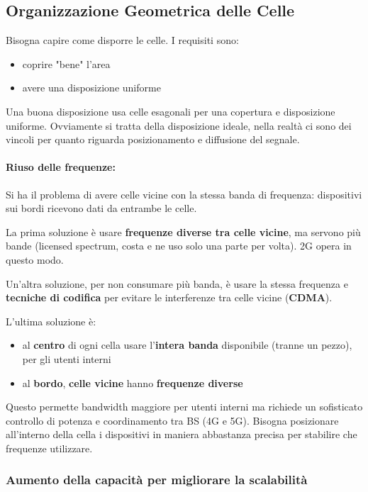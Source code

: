 \subsection{Organizzazione Geometrica delle Celle}

Bisogna capire come disporre le celle. I requisiti sono:
\begin{itemize}
	\item coprire "bene" l'area

	\item avere una disposizione uniforme
\end{itemize}

Una buona disposizione usa celle esagonali per una copertura e disposizione uniforme. Ovviamente si tratta della disposizione ideale, nella realtà ci sono dei vincoli per quanto riguarda posizionamento e diffusione del segnale.

\paragraph{Riuso delle frequenze:} Si ha il problema di avere celle vicine con la stessa banda di frequenza: dispositivi sui bordi ricevono dati da entrambe le celle. 

La prima soluzione è usare \textbf{frequenze diverse tra celle vicine}, ma servono più bande (licensed spectrum, costa e ne uso solo una parte per volta). 2G opera in questo modo.

Un'altra soluzione, per non consumare più banda, è usare la stessa frequenza e \textbf{tecniche di codifica} per evitare le interferenze tra celle vicine (\textbf{CDMA}).

L'ultima soluzione è:
\begin{itemize}
	\item al \textbf{centro} di ogni cella usare l'\textbf{intera banda} disponibile (tranne un pezzo), per gli utenti interni

	\item al \textbf{bordo}, \textbf{celle vicine} hanno \textbf{frequenze diverse}
\end{itemize}

Questo permette bandwidth maggiore per utenti interni ma richiede un sofisticato controllo di potenza e coordinamento tra BS (4G e 5G). Bisogna posizionare all'interno della cella i dispositivi in maniera abbastanza precisa per stabilire che frequenze utilizzare. 


\subsubsection{Aumento della capacità per migliorare la scalabilità}
 
